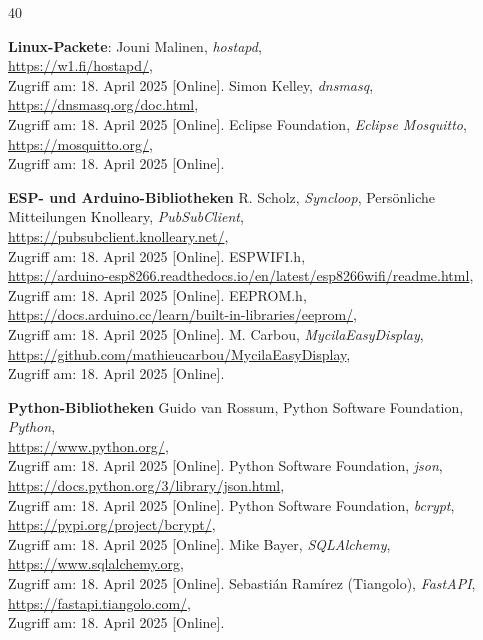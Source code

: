 \documentclass[12pt, letterpaper]{article}
\begin{document}
\begin{thebibliography}{40}
  \par \textbf{Linux-Packete}:
  Jouni Malinen, \textit{hostapd}, \\ \url{https://w1.fi/hostapd/},  \\ Zugriff am: 18. April 2025 [Online].
  Simon Kelley, \textit{dnsmasq},\\ \url{https://dnsmasq.org/doc.html}, \\ Zugriff am: 18. April 2025 [Online].
  Eclipse Foundation, \textit{Eclipse Mosquitto}, \\ \url{https://mosquitto.org/}, \\ Zugriff am: 18. April 2025 [Online].
  \par \textbf{ESP- und Arduino-Bibliotheken}
  R. Scholz, \textit{Syncloop}, Persönliche Mitteilungen
  Knolleary, \textit{PubSubClient}, \\\url{https://pubsubclient.knolleary.net/},  \\ Zugriff am: 18. April 2025 [Online].
  ESPWIFI.h, \\\url{https://arduino-esp8266.readthedocs.io/en/latest/esp8266wifi/readme.html},  \\ Zugriff am: 18. April 2025 [Online].
  EEPROM.h, \\ \url{https://docs.arduino.cc/learn/built-in-libraries/eeprom/},  \\ Zugriff am: 18. April 2025 [Online].
  M. Carbou, \textit{MycilaEasyDisplay}, \\ \url{https://github.com/mathieucarbou/MycilaEasyDisplay},  \\ Zugriff am: 18. April 2025 [Online].

  \par \textbf{Python-Bibliotheken}
  Guido van Rossum, Python Software Foundation, \textit{Python}, \\ \url{https://www.python.org/},  \\ Zugriff am: 18. April 2025 [Online].
  Python Software Foundation, \textit{json}, \\ \url{https://docs.python.org/3/library/json.html},  \\ Zugriff am: 18. April 2025 [Online].
  Python Software Foundation, \textit{bcrypt}, \\ \url{https://pypi.org/project/bcrypt/}, \\ Zugriff am: 18. April 2025 [Online].
  Mike Bayer, \textit{SQLAlchemy}, \\ \url{https://www.sqlalchemy.org}, \\ Zugriff am: 18. April 2025 [Online].
  Sebastián Ramírez (Tiangolo), \textit{FastAPI}, \\ \url{https://fastapi.tiangolo.com/}, \\ Zugriff am: 18. April 2025 [Online].
  

\end{thebibliography}



\listoffigures
{}

\listoftables
{}

\lstlistoflistings
\end{document}
